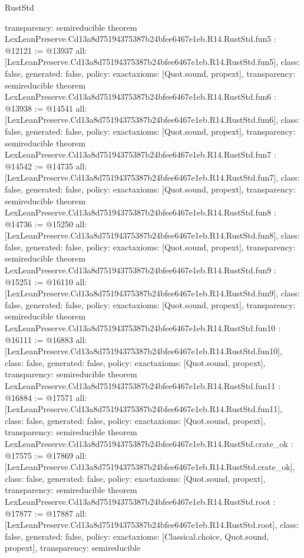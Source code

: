 \begin{lexlean}{RustStd}
\begin{coremodule}
{  transparency: semireducible
}
theorem LexLeanPreserve.Cd13a8d75194375387b24bfee6467e1eb.R14.RustStd.fun5 : @12121 := @13937 {
  all: [LexLeanPreserve.Cd13a8d75194375387b24bfee6467e1eb.R14.RustStd.fun5],
  class: false,
  generated: false,
  policy: exact{axioms: [Quot.sound, propext]},
  transparency: semireducible
}
theorem LexLeanPreserve.Cd13a8d75194375387b24bfee6467e1eb.R14.RustStd.fun6 : @13938 := @14541 {
  all: [LexLeanPreserve.Cd13a8d75194375387b24bfee6467e1eb.R14.RustStd.fun6],
  class: false,
  generated: false,
  policy: exact{axioms: [Quot.sound, propext]},
  transparency: semireducible
}
theorem LexLeanPreserve.Cd13a8d75194375387b24bfee6467e1eb.R14.RustStd.fun7 : @14542 := @14735 {
  all: [LexLeanPreserve.Cd13a8d75194375387b24bfee6467e1eb.R14.RustStd.fun7],
  class: false,
  generated: false,
  policy: exact{axioms: [Quot.sound, propext]},
  transparency: semireducible
}
theorem LexLeanPreserve.Cd13a8d75194375387b24bfee6467e1eb.R14.RustStd.fun8 : @14736 := @15250 {
  all: [LexLeanPreserve.Cd13a8d75194375387b24bfee6467e1eb.R14.RustStd.fun8],
  class: false,
  generated: false,
  policy: exact{axioms: [Quot.sound, propext]},
  transparency: semireducible
}
theorem LexLeanPreserve.Cd13a8d75194375387b24bfee6467e1eb.R14.RustStd.fun9 : @15251 := @16110 {
  all: [LexLeanPreserve.Cd13a8d75194375387b24bfee6467e1eb.R14.RustStd.fun9],
  class: false,
  generated: false,
  policy: exact{axioms: [Quot.sound, propext]},
  transparency: semireducible
}
theorem LexLeanPreserve.Cd13a8d75194375387b24bfee6467e1eb.R14.RustStd.fun10 : @16111 := @16883 {
  all: [LexLeanPreserve.Cd13a8d75194375387b24bfee6467e1eb.R14.RustStd.fun10],
  class: false,
  generated: false,
  policy: exact{axioms: [Quot.sound, propext]},
  transparency: semireducible
}
theorem LexLeanPreserve.Cd13a8d75194375387b24bfee6467e1eb.R14.RustStd.fun11 : @16884 := @17571 {
  all: [LexLeanPreserve.Cd13a8d75194375387b24bfee6467e1eb.R14.RustStd.fun11],
  class: false,
  generated: false,
  policy: exact{axioms: [Quot.sound, propext]},
  transparency: semireducible
}
theorem LexLeanPreserve.Cd13a8d75194375387b24bfee6467e1eb.R14.RustStd.crate_ok : @17575 := @17869 {
  all: [LexLeanPreserve.Cd13a8d75194375387b24bfee6467e1eb.R14.RustStd.crate_ok],
  class: false,
  generated: false,
  policy: exact{axioms: [Quot.sound, propext]},
  transparency: semireducible
}
theorem LexLeanPreserve.Cd13a8d75194375387b24bfee6467e1eb.R14.RustStd.root : @17877 := @17887 {
  all: [LexLeanPreserve.Cd13a8d75194375387b24bfee6467e1eb.R14.RustStd.root],
  class: false,
  generated: false,
  policy: exact{axioms: [Classical.choice, Quot.sound, propext]},
  transparency: semireducible
}


\end{coremodule}
\end{lexlean}
